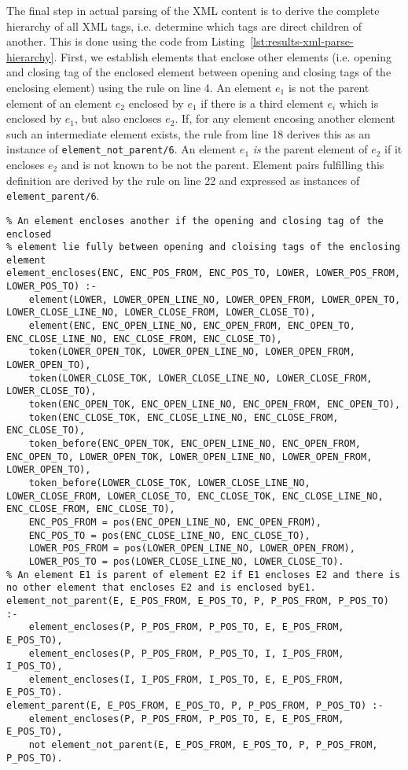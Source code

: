 The final step in actual parsing of the XML content is to derive the complete hierarchy of all XML tags, i.e. determine which tags are direct children of another. This is done using the code from Listing~\ref{lst:results-xml-parse-hierarchy}. First, we establish elements that enclose other elements (i.e. opening and closing tag of the enclosed element between opening and closing tags of the enclosing element) using the rule on line 4. An element $e_1$ is not the parent element of an element $e_2$ enclosed by $e_1$ if there is a third element $e_i$ which is enclosed by $e_1$, but also encloses $e_2$. If, for any element encosing another element such an intermediate element exists, the rule from line 18 derives this as an instance of \texttt{element\_not\_parent/6}. An element $e_1$ \emph{is} the parent element of $e_2$ if it encloses $e_2$ and is not known to be not the parent. Element pairs fulfilling this definition are derived by the rule on line 22 and expressed as instances of \texttt{element\_parent/6}.

\begin{lstlisting}[style=asp-code, label={lst:results-xml-parse-hierarchy}, caption={Parsing XML attributes.}]
% Derive parent elements
% An element encloses another if the opening and closing tag of the enclosed 
% element lie fully between opening and cloising tags of the enclosing element
element_encloses(ENC, ENC_POS_FROM, ENC_POS_TO, LOWER, LOWER_POS_FROM, LOWER_POS_TO) :- 
	element(LOWER, LOWER_OPEN_LINE_NO, LOWER_OPEN_FROM, LOWER_OPEN_TO, LOWER_CLOSE_LINE_NO, LOWER_CLOSE_FROM, LOWER_CLOSE_TO),
	element(ENC, ENC_OPEN_LINE_NO, ENC_OPEN_FROM, ENC_OPEN_TO, ENC_CLOSE_LINE_NO, ENC_CLOSE_FROM, ENC_CLOSE_TO),
	token(LOWER_OPEN_TOK, LOWER_OPEN_LINE_NO, LOWER_OPEN_FROM, LOWER_OPEN_TO),
	token(LOWER_CLOSE_TOK, LOWER_CLOSE_LINE_NO, LOWER_CLOSE_FROM, LOWER_CLOSE_TO),
	token(ENC_OPEN_TOK, ENC_OPEN_LINE_NO, ENC_OPEN_FROM, ENC_OPEN_TO),
	token(ENC_CLOSE_TOK, ENC_CLOSE_LINE_NO, ENC_CLOSE_FROM, ENC_CLOSE_TO),
	token_before(ENC_OPEN_TOK, ENC_OPEN_LINE_NO, ENC_OPEN_FROM, ENC_OPEN_TO, LOWER_OPEN_TOK, LOWER_OPEN_LINE_NO, LOWER_OPEN_FROM, LOWER_OPEN_TO),
	token_before(LOWER_CLOSE_TOK, LOWER_CLOSE_LINE_NO, LOWER_CLOSE_FROM, LOWER_CLOSE_TO, ENC_CLOSE_TOK, ENC_CLOSE_LINE_NO, ENC_CLOSE_FROM, ENC_CLOSE_TO),
	ENC_POS_FROM = pos(ENC_OPEN_LINE_NO, ENC_OPEN_FROM),
	ENC_POS_TO = pos(ENC_CLOSE_LINE_NO, ENC_CLOSE_TO),
	LOWER_POS_FROM = pos(LOWER_OPEN_LINE_NO, LOWER_OPEN_FROM),
	LOWER_POS_TO = pos(LOWER_CLOSE_LINE_NO, LOWER_CLOSE_TO).
% An element E1 is parent of element E2 if E1 encloses E2 and there is no other element that encloses E2 and is enclosed byE1.   
element_not_parent(E, E_POS_FROM, E_POS_TO, P, P_POS_FROM, P_POS_TO) :- 
	element_encloses(P, P_POS_FROM, P_POS_TO, E, E_POS_FROM, E_POS_TO),
	element_encloses(P, P_POS_FROM, P_POS_TO, I, I_POS_FROM, I_POS_TO),
	element_encloses(I, I_POS_FROM, I_POS_TO, E, E_POS_FROM, E_POS_TO).
element_parent(E, E_POS_FROM, E_POS_TO, P, P_POS_FROM, P_POS_TO) :- 
	element_encloses(P, P_POS_FROM, P_POS_TO, E, E_POS_FROM, E_POS_TO),
	not element_not_parent(E, E_POS_FROM, E_POS_TO, P, P_POS_FROM, P_POS_TO).
\end{lstlisting}         